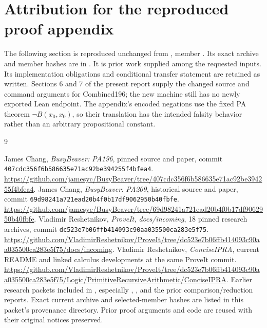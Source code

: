 \documentclass[11pt,a4paper]{article}
\begin{document}
\section*{Attribution for the reproduced proof appendix}
The following section is reproduced unchanged from
, member
.
Its exact archive and member hashes are in
. It is prior work supplied
among the requested inputs. Its implementation obligations and conditional
transfer statement are retained as written. Sections 6 and 7 of the present
report supply the changed source and command arguments for Combined196;
the new machine still has no newly exported Lean endpoint. The appendix's
encoded negations use the fixed PA theorem $\neg B(x_0,x_0)$, so their
translation has the intended falsity behavior rather than an arbitrary
propositional constant.

\begin{thebibliography}{9}
\raggedright
{}
James Chang, \emph{BusyBeaver: PA196}, pinned source and paper,
commit \texttt{407cdc356f6b586635e71ac92be394255f4bfea4}.
\url{https://github.com/jamesyc/BusyBeaver/tree/407cdc356f6b586635e71ac92be394255f4bfea4}.
James Chang, \emph{BusyBeaver: PA209}, historical source and paper,
commit \texttt{69d98241a721ead20b4f0b17df9062950b40fbfe}.
\url{https://github.com/jamesyc/BusyBeaver/tree/69d98241a721ead20b4f0b17df9062950b40fbfe}.
Vladimir Reshetnikov, \emph{ProveIt, docs/incoming}, 18 pinned research
archives, commit \texttt{dc523e7b06ffb414093c90aa035500ca283e5f75}.
\url{https://github.com/VladimirReshetnikov/ProveIt/tree/dc523e7b06ffb414093c90aa035500ca283e5f75/docs/incoming}.
Vladimir Reshetnikov, \emph{ConciseIPRA}, current README and linked
calculus developments at the same ProveIt commit.
\url{https://github.com/VladimirReshetnikov/ProveIt/tree/dc523e7b06ffb414093c90aa035500ca283e5f75/Logic/PrimitiveRecursiveArithmetic/ConciseIPRA}.
Earlier research packets included in \cite{incoming}, especially
,
, and the prior comparison/reduction
reports. Exact current archive and selected-member hashes are listed in
this packet's provenance directory. Prior proof arguments and code are
reused with their original notices preserved.
\end{thebibliography}
\end{document}
